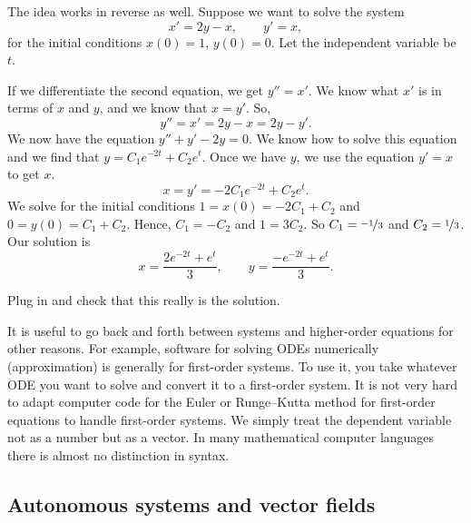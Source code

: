 \begin{example}
The idea works in reverse as well.
Suppose we want to solve
the system
\begin{equation*}
x' = 2y-x , \qquad
y' = x, 
\end{equation*}
for the initial
conditions $x(0) = 1$, $y(0) =0$.
Let the independent variable be $t$.

If we differentiate the second equation, we get
$y''=x'$.  We know what $x'$ is in terms of $x$ and $y$, and
we know that $x=y'$.  So,
\begin{equation*}
y'' = x' = 2y-x = 2y-y' .
\end{equation*}
We now have the equation $y''+y'-2y = 0$.  We know how to solve this
equation and we find that $y = C_1 e^{-2t} + C_2 e^t$.  Once we have $y$,
we use the equation $y' = x$ to get $x$.
\begin{equation*}
x = y' = -2 C_1 e^{-2t} + C_2 e^t .
\end{equation*}
We solve for the initial conditions $1 = x(0) = -2 C_1 + C_2$
and $0 = y(0) = C_1 + C_2$.  Hence, $C_1 = -C_2$ and $1 = 3C_2$.
So $C_1 = \nicefrac{-1}{3}$ and $C_2 = \nicefrac{1}{3}$.  Our solution is
\begin{equation*}
x = \frac{2e^{-2t} + e^t}{3} ,\qquad
y = \frac{-e^{-2t} + e^t}{3} .
\end{equation*}
\end{example}

\begin{exercise}
Plug in and check that this really is the solution.
\end{exercise}

It is useful to go back and forth between systems
and higher-order equations
for other reasons.  For example, software for solving ODEs numerically
(approximation) is generally for first-order systems.  To use it,
you take whatever ODE you want to solve and convert it to a
first-order system.  It is not very hard
to adapt computer code for the Euler or Runge--Kutta method for
first-order equations to
handle first-order systems.
We simply treat the dependent variable not as
a number but as a vector.  In many mathematical computer languages there is
almost no distinction in syntax.


\subsection{Autonomous systems and vector fields}

